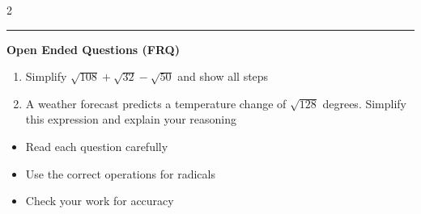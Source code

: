 \documentclass[10pt]{article}
\begin{document}
\begin{multicols}{2}
\begin{enumerate}[label=\textbf{Q\arabic*.}, leftmargin=*, itemsep=6pt, parsep=0pt]
\end{enumerate}
\end{multicols}

\vspace{-0.2cm}
\hrule
\vspace{0.2cm}
\textbf{\small Open Ended Questions (FRQ)}
\begin{enumerate}[label=\textbf{Q\arabic*.}, start=9, itemsep=5pt, topsep=0pt]

  \item \small Simplify $\sqrt{108} + \sqrt{32} - \sqrt{50}$ and show all steps \vspace{2cm}

  \item \small A weather forecast predicts a temperature change of $\sqrt{128}$ degrees. Simplify this expression and explain your reasoning \vspace{2cm}

\end{enumerate}

\vfill

\begin{tcolorbox}[colback=blue!5, colframe=mainblue!50, title=\small \textbf{Chef's Tips}, fonttitle=\bfseries, bottom=1mm]
\begin{itemize}[noitemsep, topsep=2pt, leftmargin=0.5cm]
  \item \scriptsize Read each question carefully\item \scriptsize Use the correct operations for radicals\item \scriptsize Check your work for accuracy
\end{itemize}
\end{tcolorbox}
\end{document}
